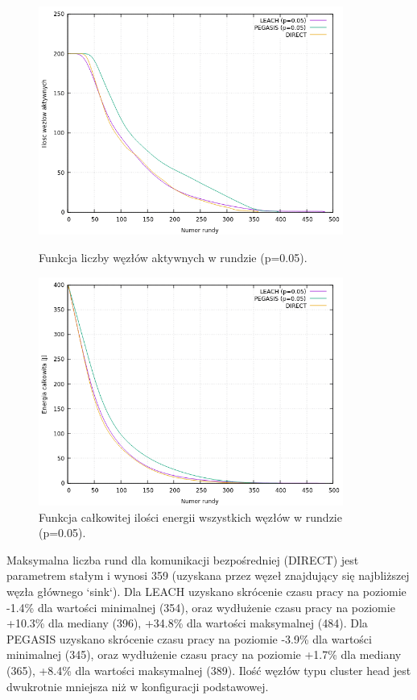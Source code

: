 \documentclass[a4paper,12pt,twoside,openany]{report}
\begin{document}
\begin{figure}[H]
 \centering
 \includegraphics[width=10cm]{images/gnuplot/test_4/nodes_in_round_p005.png}
 \caption{Funkcja liczby węzłów aktywnych w rundzie (p=0.05).}
 \includegraphics[width=10cm]{images/gnuplot/test_4/energy_in_round_p005.png}
 \caption{Funkcja całkowitej ilości energii wszystkich węzłów w rundzie (p=0.05).}
\end{figure}

\par
Maksymalna liczba rund dla komunikacji bezpośredniej (DIRECT) jest parametrem stałym i wynosi 359 (uzyskana przez węzeł znajdujący się najbliższej węzła głównego `sink`).
Dla LEACH uzyskano skrócenie czasu pracy na poziomie -1.4\% dla wartości minimalnej (354), oraz wydłużenie czasu pracy na poziomie +10.3\% dla mediany (396), +34.8\% dla wartości maksymalnej (484).
Dla PEGASIS uzyskano skrócenie czasu pracy na poziomie -3.9\% dla wartości minimalnej (345), oraz wydłużenie czasu pracy na poziomie +1.7\% dla mediany (365), +8.4\% dla wartości maksymalnej (389).
Ilość węzłów typu cluster head jest dwukrotnie mniejsza niż w konfiguracji podstawowej.
\end{document}
